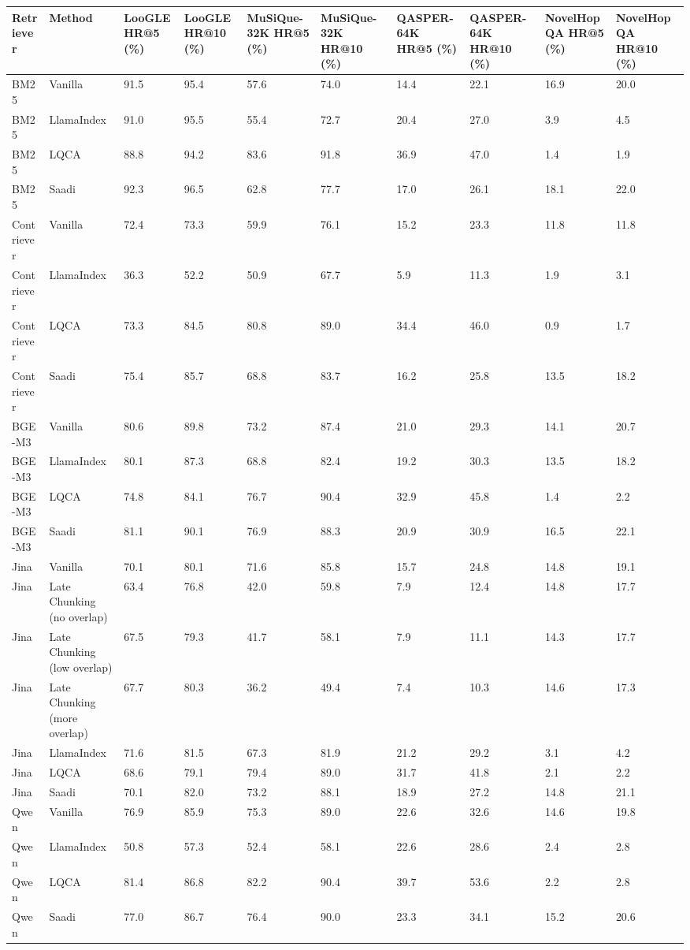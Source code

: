 \begin{tabular}{llllllllll}
\hline
Retriever & Method & LooGLE HR@5 (\%) & LooGLE HR@10 (\%) & MuSiQue-32K HR@5 (\%) & MuSiQue-32K HR@10 (\%) & QASPER-64K HR@5 (\%) & QASPER-64K HR@10 (\%) & NovelHopQA HR@5 (\%) & NovelHopQA HR@10 (\%) \\
\hline
BM25 & Vanilla & 91.5 & 95.4 & 57.6 & 74.0 & 14.4 & 22.1 & 16.9 & 20.0 \\
BM25 & LlamaIndex & 91.0 & 95.5 & 55.4 & 72.7 & 20.4 & 27.0 & 3.9 & 4.5 \\
BM25 & LQCA & 88.8 & 94.2 & 83.6 & 91.8 & 36.9 & 47.0 & 1.4 & 1.9 \\
BM25 & Saadi & 92.3 & 96.5 & 62.8 & 77.7 & 17.0 & 26.1 & 18.1 & 22.0 \\
Contriever & Vanilla & 72.4 & 73.3 & 59.9 & 76.1 & 15.2 & 23.3 & 11.8 & 11.8 \\
Contriever & LlamaIndex & 36.3 & 52.2 & 50.9 & 67.7 & 5.9 & 11.3 & 1.9 & 3.1 \\
Contriever & LQCA & 73.3 & 84.5 & 80.8 & 89.0 & 34.4 & 46.0 & 0.9 & 1.7 \\
Contriever & Saadi & 75.4 & 85.7 & 68.8 & 83.7 & 16.2 & 25.8 & 13.5 & 18.2 \\
BGE-M3 & Vanilla & 80.6 & 89.8 & 73.2 & 87.4 & 21.0 & 29.3 & 14.1 & 20.7 \\
BGE-M3 & LlamaIndex & 80.1 & 87.3 & 68.8 & 82.4 & 19.2 & 30.3 & 13.5 & 18.2 \\
BGE-M3 & LQCA & 74.8 & 84.1 & 76.7 & 90.4 & 32.9 & 45.8 & 1.4 & 2.2 \\
BGE-M3 & Saadi & 81.1 & 90.1 & 76.9 & 88.3 & 20.9 & 30.9 & 16.5 & 22.1 \\
Jina & Vanilla & 70.1 & 80.1 & 71.6 & 85.8 & 15.7 & 24.8 & 14.8 & 19.1 \\
Jina & Late Chunking (no overlap) & 63.4 & 76.8 & 42.0 & 59.8 & 7.9 & 12.4 & 14.8 & 17.7 \\
Jina & Late Chunking (low overlap) & 67.5 & 79.3 & 41.7 & 58.1 & 7.9 & 11.1 & 14.3 & 17.7 \\
Jina & Late Chunking (more overlap) & 67.7 & 80.3 & 36.2 & 49.4 & 7.4 & 10.3 & 14.6 & 17.3 \\
Jina & LlamaIndex & 71.6 & 81.5 & 67.3 & 81.9 & 21.2 & 29.2 & 3.1 & 4.2 \\
Jina & LQCA & 68.6 & 79.1 & 79.4 & 89.0 & 31.7 & 41.8 & 2.1 & 2.2 \\
Jina & Saadi & 70.1 & 82.0 & 73.2 & 88.1 & 18.9 & 27.2 & 14.8 & 21.1 \\
Qwen & Vanilla & 76.9 & 85.9 & 75.3 & 89.0 & 22.6 & 32.6 & 14.6 & 19.8 \\
Qwen & LlamaIndex & 50.8 & 57.3 & 52.4 & 58.1 & 22.6 & 28.6 & 2.4 & 2.8 \\
Qwen & LQCA & 81.4 & 86.8 & 82.2 & 90.4 & 39.7 & 53.6 & 2.2 & 2.8 \\
Qwen & Saadi & 77.0 & 86.7 & 76.4 & 90.0 & 23.3 & 34.1 & 15.2 & 20.6 \\
\hline
\end{tabular}
